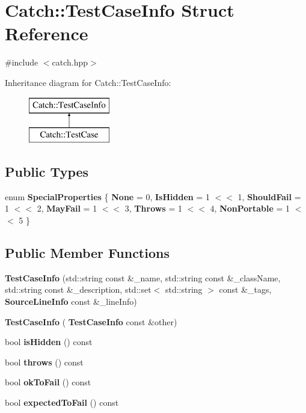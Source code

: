 \section{Catch\+:\+:Test\+Case\+Info Struct Reference}
\label{struct_catch_1_1_test_case_info}


{\ttfamily \#include $<$catch.\+hpp$>$}

Inheritance diagram for Catch\+:\+:Test\+Case\+Info\+:\begin{figure}[H]
\begin{center}
\leavevmode
\includegraphics[height=2.000000cm]{struct_catch_1_1_test_case_info}
\end{center}
\end{figure}
\subsection*{Public Types}
\begin{DoxyCompactItemize}
\item 
enum \textbf{ Special\+Properties} \{ \newline
\textbf{ None} = 0, 
\textbf{ Is\+Hidden} = 1 $<$$<$ 1, 
\textbf{ Should\+Fail} = 1 $<$$<$ 2, 
\textbf{ May\+Fail} = 1 $<$$<$ 3, 
\newline
\textbf{ Throws} = 1 $<$$<$ 4, 
\textbf{ Non\+Portable} = 1 $<$$<$ 5
 \}
\end{DoxyCompactItemize}
\subsection*{Public Member Functions}
\begin{DoxyCompactItemize}
\item 
\textbf{ Test\+Case\+Info} (std\+::string const \&\+\_\+name, std\+::string const \&\+\_\+class\+Name, std\+::string const \&\+\_\+description, std\+::set$<$ std\+::string $>$ const \&\+\_\+tags, \textbf{ Source\+Line\+Info} const \&\+\_\+line\+Info)
\item 
\textbf{ Test\+Case\+Info} (\textbf{ Test\+Case\+Info} const \&other)
\item 
bool \textbf{ is\+Hidden} () const
\item 
bool \textbf{ throws} () const
\item 
bool \textbf{ ok\+To\+Fail} () const
\item 
bool \textbf{ expected\+To\+Fail} () const
\end{DoxyCompactItemize}
